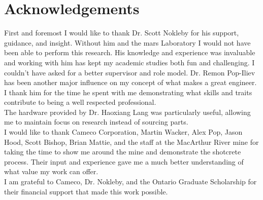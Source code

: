 \chapter*{Acknowledgements}
First and foremost I would like to thank Dr. Scott Nokleby for his support, guidance, and insight. Without him and the \acrshort{mars} Laboratory I would not have been able to perform this research. His knowledge and experience was invaluable and working with him has kept my academic studies both fun and challenging. I couldn't have asked for a better supervisor and role model. Dr. Remon Pop-Iliev has been another major influence on my concept of what makes a great engineer. I thank him for the time he spent with me demonstrating what skills and traits contribute to being a well respected professional.\\

The hardware provided by Dr. Haoxiang Lang was particularly useful, allowing me to maintain focus on research instead of sourcing parts.\\

I would like to thank Cameco Corporation, Martin Wacker, Alex Pop, Jason Hood, Scott Bishop, Brian Mattie, and the staff at the MacArthur River mine for taking the time to show me around the mine and demonstrate the shotcrete process. Their input and experience gave me a much better understanding of what value my work can offer.\\

I am grateful to Cameco, Dr. Nokleby, and the Ontario Graduate Scholarship for their financial support that made this work possible.\\



